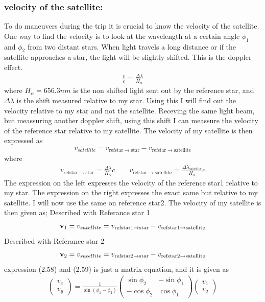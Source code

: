 \documentclass[a4paper,11pt,english]{report}
\begin{document}
\subsubsection{velocity of the satellite:} To do maneuvers during the trip it
is crucial to know the velocity of the satellite. One way to find the velocity
is to look at the wavelength at a certain angle \(\phi_{1}\) and \(\phi_{2}\) from two distant
stars. When light travels a long
distance or if the satellite approaches a star, the light will be slightly shifted. 
This is the doppler effect.
\begin{align}
  \frac{v}{c} = \frac{\Delta\lambda}{H_{\alpha}}
\end{align}
where \(H_{\alpha} = 656.3nm\) is the non shifted light sent out by the
reference star, and
\(\Delta \lambda\) is the shift measured relative to my star. Using this I will
find out the velocity relative to my star and not the satellite. Receving the
same light beam, but meassuring another doppler shift, using this shift I
can meassure the velocity of the reference star relative to my satellite. The
velocity of my satellite is then expressed as
\begin{align}
  v_{satellite} = v_{\mathrm{refstar}\to\mathrm{star}} - v_{\mathrm{refstar}\to\mathrm{satellite}}
\end{align}
where
  \begin{align}
    v_{\mathrm{refstar}\to\mathrm{star}}  = \frac{\Delta \lambda}{H_{\alpha}}c
    \qquad
    v_{\mathrm{refstar}\to\mathrm{satellite}} =  \frac{\Delta \lambda_{\mathrm{satellite}}}{H_{\alpha}}c
  \end{align}
The expression on the left expresses the velocity of the reference star1
relative to my star. The expression on the right expresses the exact same but
relative to my satellite. I will now use the same on reference star2. The
velocity of my satellite is then given as; Described with Referance star 1
\begin{align}
  \bold{v}_{1} =  v_{satellite} = v_{\mathrm{refstar1}\to\mathrm{star}} -
  v_{\mathrm{refstar1}\to\mathrm{satellite}}
\end{align}
Described with Referance star 2
\begin{align}
  \bold{ v}_{2} =  v_{satellite} = v_{\mathrm{refstar2}\to\mathrm{star}} -
  v_{\mathrm{refstar2}\to\mathrm{satellite}} 
\end{align}
expression (2.58) and (2.59) is just a matrix equation, and it is given as
\begin{align}
  \begin{pmatrix}
    v_{x}\\
    v_{y}
  \end{pmatrix}
  = \frac{1}{\sin{(\phi_{1} - \phi_{2})}}
  \begin{pmatrix}
    \sin{\phi_{2}} & -\sin{\phi_{1}}\\
    -\cos{\phi_{2}} & \cos{\phi_{1}}
  \end{pmatrix}
                      \begin{pmatrix}
                        v_{1}\\
                        v_{2}
                      \end{pmatrix}
\end{align}
\end{document}
